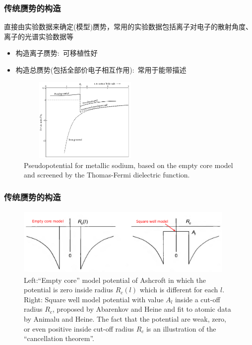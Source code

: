 \frame
{
	\frametitle{传统赝势的构造}
	直接由实验数据来确定(模型)赝势，常用的实验数据包括离子对电子的散射角度、离子的光谱实验数据等
		\begin{itemize}
			\item 构造离子赝势:~可移植性好
			\item 构造总赝势(包括全部价电子相互作用):~常用于能带描述
		\end{itemize}
\begin{figure}[h!]
\centering
\vspace*{-0.10in}
\includegraphics[height=1.60in,width=2.57in,viewport=0 0 980 600,clip]{Figures/Pseudo-model-empty_core.png}
\caption{\tiny \textrm{Pseudopotential for metallic sodium, based on the empty core model and screened by the Thomas-Fermi dielectric function.}}%
\label{Pseudo_model-empty_core}
\end{figure}
}

\frame
{
	\frametitle{传统赝势的构造}
\begin{figure}[h!]
\centering
\vspace*{-0.10in}
\includegraphics[height=1.30in,width=4.17in,viewport=0 0 1150 350,clip]{Figures/Pseudo-model.png}
\caption{\tiny \textrm{Left:``Empty core'' model potential of Ashcroft in which the potential is zero inside radius $R_c(l)$ which is different for each $l$. Right: Square well model potential with value $A_l$ inside a cut-off radius $R_c$, proposed by Abarenkov and Heine and fit to atomic data by Animalu and Heine. The fact that the potential are weak, zero, or even positive inside cut-off radius $R_c$ is an illustration of the ``cancellation theorem''.}}%
\label{Pseudo-model}
\end{figure}
}

